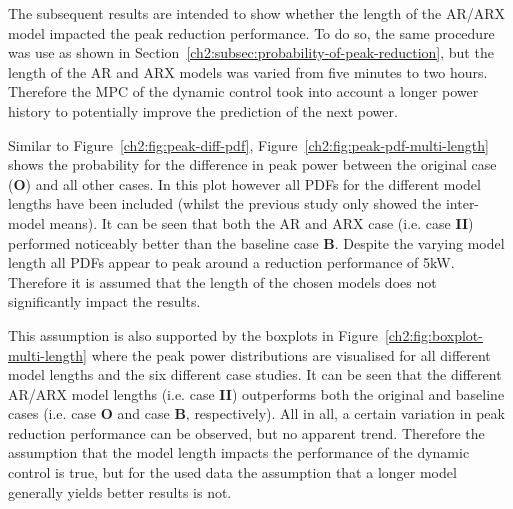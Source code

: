 The subsequent results are intended to show whether the length of the AR/ARX model impacted the peak reduction performance.
To do so, the same procedure was use as shown in Section~\ref{ch2:subsec:probability-of-peak-reduction}, but the length of the AR and ARX models was varied from five minutes to two hours.
Therefore the MPC of the dynamic control took into account a longer power history to potentially improve the prediction of the next power.



Similar to Figure~\ref{ch2:fig:peak-diff-pdf}, Figure~\ref{ch2:fig:peak-pdf-multi-length} shows the probability for the difference in peak power between the original case (\textbf{O}) and all other cases.
In this plot however all PDFs for the different model lengths have been included (whilst the previous study only showed the inter-model means).
It can be seen that both the AR and ARX case (i.e. case \textbf{II}) performed noticeably better than the baseline case \textbf{B}.
Despite the varying model length all PDFs appear to peak around a reduction performance of 5kW.
Therefore it is assumed that the length of the chosen models does not significantly impact the results.



This assumption is also supported by the boxplots in Figure~\ref{ch2:fig:boxplot-multi-length} where the peak power distributions are visualised for all different model lengths and the six different case studies.
It can be seen that the different AR/ARX model lengths (i.e. case \textbf{II}) outperforms both the original and baseline cases (i.e. case \textbf{O} and case \textbf{B}, respectively).
All in all, a certain variation in peak reduction performance can be observed, but no apparent trend.
Therefore the assumption that the model length impacts the performance of the dynamic control is true, but for the used data the assumption that a longer model generally yields better results is not.
